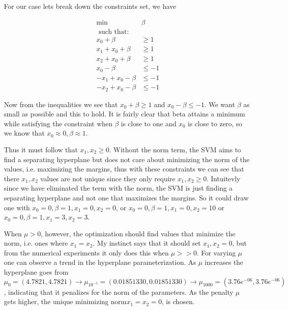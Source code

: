 \documentclass{article} %
\begin{document}
\begin{enumerate}
\begin{itemize}
For our case lets break down the constraints set, we have 

\begin{equation*}
\begin{aligned}
\mbox{min    } & \beta \\
\mbox{ such that:} \\ 
x_0 + \beta &\geq 1 \\ 
x_1 + x_0 + \beta &\geq 1 \\ 
x_2 + x_0 + \beta &\geq 1\\
x_0 - \beta &\leq -1\\
-x_1 + x_0 - \beta &\leq -1\\
-x_2 + x_0 - \beta &\leq -1
\end{aligned}
\end{equation*}

Now from the inequalities we see that $x_0 + \beta \geq 1$ and $x_0 - \beta \leq -1$. We want $\beta$ as small as possible and this to hold. It is fairly clear that beta attains a minimum while satisfying the constraint when $\beta$ is close to one and $x_0$ is close to zero, so we know that $x_0 \approx 0, \beta \approx 1$. 
\par 
 
Thus it must follow that $x_1, x_2 \geq 0$. Without the norm term, the SVM aims to find a separating hyperplane but does not care about minimizing the norm of the values, i.e. maximizing the margins, thus with these constraints we can see that there $x_1, x_2$ values are not unique since they  only require $x_1, x_2 \geq 0$. Intuitevly since we have eliminated the term with the norm, the SVM is just finding a separating hyperplane and not one that maximizes the margins. So it could draw one with $x_0 = 0, \beta = 1, x_1= 0, x_2 = 0$, or $x_0 = 0, \beta = 1, x_1 = 0, x_2 = 10$ or $x_0 = 0, \beta = 1, x_1 = 3, x_2 = 3$.  \par

When $\mu > 0$, however, the optimization should find values that minimize the norm, i.e. ones where $x_1 = x_2$. My instinct says that it should set $x_1,x_2 = 0$, but from the numerical experiments it only does this when $\mu >> 0$.  For varying $\mu$ one can observe a trend in the hyperplane parameterization. As $\mu$ increases the hyperplane goes from $ \mu_0 = (4.7821, 4.7821)\rightarrow \mu_{10^{-5}} = (0.01851330, 0.01851330) \rightarrow \mu_{1000} = (3.76e^{-06} ,3.76e^{-06})$, indicating that it penalizes for the norm of the parameters. As the penalty $\mu$ gets higher, the unique minimizing norm$x_1 = x_2 = 0$, is chosen. 


\end{itemize}
\end{enumerate}
\end{document}
